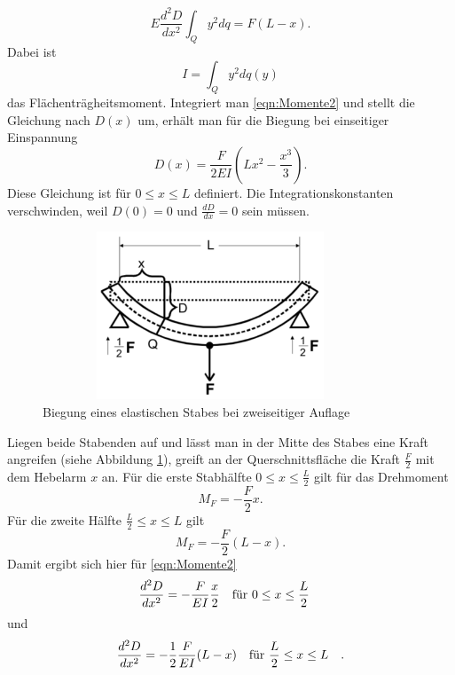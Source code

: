\begin{equation}
E \frac{d^2D}{dx^2} \int_{Q} y^2 dq = F(L-x).
\label{eqn:Momente2}
\end{equation}
Dabei ist
\begin{equation*}
I = \int_{Q} y^2 dq(y)
\end{equation*}
das Flächenträgheitsmoment.
Integriert man \eqref{eqn:Momente2} und stellt die Gleichung
nach $D(x)$ um, erhält man für die Biegung bei einseitiger Einspannung
\begin{equation}
D(x) = \frac{F}{2EI} (Lx^2- \frac{x^3}{3}).
\label{eqn:D1}
\end{equation}
Diese Gleichung ist für $0 \leq x \leq L$ definiert.
Die Integrationskonstanten verschwinden, weil $D(0) = 0$ und $\frac{dD}{dx} = 0$ sein müssen.

\begin{figure}
    \centering
\includegraphics[width= 10cm, height= 5cm]{./plots/abb2.png}
\caption{Biegung eines elastischen Stabes bei zweiseitiger Auflage}
\label{fig:abb2}
\end{figure}
\noindent Liegen beide Stabenden auf und lässt man in der Mitte des Stabes
eine Kraft angreifen (siehe Abbildung \ref{fig:abb2}), greift an der Querschnittsfläche die Kraft
$\frac{F}{2}$ mit dem Hebelarm $x$ an. Für die erste Stabhälfte $0 \leq x \leq \frac{L}{2}$
gilt für das Drehmoment
\begin{equation*}
M_{F} = - \frac{F}{2} x.
\end{equation*}
Für die zweite Hälfte $\frac{L}{2} \leq x \leq L$ gilt
\begin{equation*}
M_{F} = - \frac{F}{2} (L-x).
\end{equation*}
Damit ergibt sich hier für \eqref{eqn:Momente2}
\begin{equation}
\frac{d^2D}{dx^2} = - \frac{F}{EI} \frac{x}{2} \qq{für $0 \leq x \leq \frac{L}{2}$}
\label{eqn:links}
\end{equation}
und
\begin{equation}
\frac{d^2D}{dx^2} = -\frac{1}{2} \frac{F}{EI} (L-x) \qq{für $\frac{L}{2} \leq x \leq L$}.
\label{eqn:rechts}
\end{equation}
